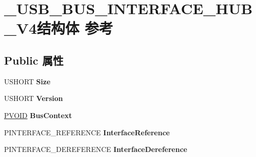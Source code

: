 \hypertarget{struct___u_s_b___b_u_s___i_n_t_e_r_f_a_c_e___h_u_b___v4}{}\section{\+\_\+\+U\+S\+B\+\_\+\+B\+U\+S\+\_\+\+I\+N\+T\+E\+R\+F\+A\+C\+E\+\_\+\+H\+U\+B\+\_\+\+V4结构体 参考}
\label{struct___u_s_b___b_u_s___i_n_t_e_r_f_a_c_e___h_u_b___v4}
\subsection*{Public 属性}
\begin{DoxyCompactItemize}
\item 
\mbox{\label{struct___u_s_b___b_u_s___i_n_t_e_r_f_a_c_e___h_u_b___v4_aef76f49f0bc01700f207b4fd525e44b7}} 
U\+S\+H\+O\+RT {\bfseries Size}
\item 
\mbox{\label{struct___u_s_b___b_u_s___i_n_t_e_r_f_a_c_e___h_u_b___v4_ae4a78d35a9835e47886069b5bc9207f1}} 
U\+S\+H\+O\+RT {\bfseries Version}
\item 
\mbox{\label{struct___u_s_b___b_u_s___i_n_t_e_r_f_a_c_e___h_u_b___v4_ae3503c8047eaca15798da85653f5d941}} 
\hyperlink{interfacevoid}{P\+V\+O\+ID} {\bfseries Bus\+Context}
\item 
\mbox{\label{struct___u_s_b___b_u_s___i_n_t_e_r_f_a_c_e___h_u_b___v4_aab4fbeacacfaa72dbaced1004b422b24}} 
P\+I\+N\+T\+E\+R\+F\+A\+C\+E\+\_\+\+R\+E\+F\+E\+R\+E\+N\+CE {\bfseries Interface\+Reference}
\item 
\mbox{\label{struct___u_s_b___b_u_s___i_n_t_e_r_f_a_c_e___h_u_b___v4_a578225168a52aa91380bd2c2c072e312}} 
P\+I\+N\+T\+E\+R\+F\+A\+C\+E\+\_\+\+D\+E\+R\+E\+F\+E\+R\+E\+N\+CE {\bfseries Interface\+Dereference}
\item 
\mbox{\label{struct___u_s_b___b_u_s___i_n_t_e_r_f_a_c_e___h_u_b___v4_a2596ce6d7a4bd4e73752738d11036621}} 

\end{DoxyCompactItemize}

